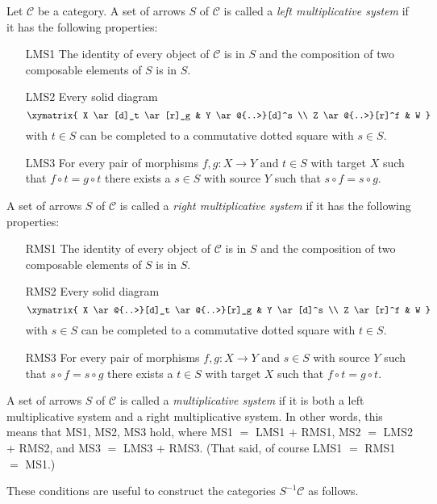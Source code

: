 \begin{definition}
\label{definition-multiplicative-system}
Let $\mathcal{C}$ be a category. A set of arrows $S$ of $\mathcal{C}$ is
called a {\it left multiplicative system} if it has the following properties:
\begin{enumerate}
\item[LMS1] The identity of every object of $\mathcal{C}$ is in $S$ and
the composition of two composable elements of $S$ is in $S$.
\item[LMS2] Every solid diagram
$$
\xymatrix{
X \ar[d]_t \ar[r]_g & Y \ar@{..>}[d]^s \\
Z \ar@{..>}[r]^f & W
}
$$
with $t \in S$ can be completed to a commutative dotted square with
$s \in S$.
\item[LMS3] For every pair of morphisms $f, g : X \to Y$ and
$t \in S$ with target $X$ such that $f \circ t = g \circ t$
there exists a $s \in S$ with source $Y$ such that
$s \circ f = s \circ g$.
\end{enumerate}
A set of arrows $S$ of $\mathcal{C}$ is
called a {\it right multiplicative system}
if it has the following properties:
\begin{enumerate}
\item[RMS1] The identity of every object of $\mathcal{C}$ is in $S$ and
the composition of two composable elements of $S$ is in $S$.
\item[RMS2] Every solid diagram
$$
\xymatrix{
X \ar@{..>}[d]_t \ar@{..>}[r]_g & Y \ar[d]^s \\
Z \ar[r]^f & W
}
$$
with $s \in S$ can be completed to a commutative dotted square with
$t \in S$.
\item[RMS3] For every pair of morphisms $f, g : X \to Y$ and
$s \in S$ with source $Y$ such that $s \circ f = s \circ g$
there exists a $t \in S$ with target $X$ such that
$f \circ t = g \circ t$.
\end{enumerate}
A set of arrows $S$ of $\mathcal{C}$ is called a {\it multiplicative system}
if it is both a left multiplicative system and a right multiplicative system.
In other words, this means that MS1, MS2, MS3 hold, where
MS1 $=$ LMS1 $+$ RMS1, MS2 $=$ LMS2 $+$ RMS2, and
MS3 $=$ LMS3 $+$ RMS3. (That said, of course LMS1 $=$ RMS1
$=$ MS1.)
\end{definition}

\noindent
These conditions are useful to construct the categories $S^{-1}\mathcal{C}$
as follows.


